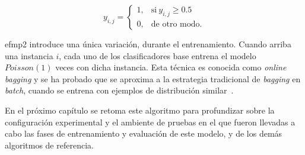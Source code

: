 \begin{equation}
	y_{i,j} =
	\begin{cases}
		1, & \text{si}\ y_{i,j} \geq 0.5 \\
		0, & \text{de otro modo.}
	\end{cases}
\end{equation}

\acrshort{efmp2} introduce una única variación, durante el entrenamiento. Cuando
arriba una instancia $i$, cada uno de los clasificadores base entrena el modelo
$Poisson(1)$ veces con dicha instancia. Esta técnica es conocida como
\textit{online bagging} y se ha probado que se aproxima a la estrategia
tradicional de \textit{bagging} en \textit{batch}, cuando se entrena con
ejemplos de distribución similar~\cite{oza_online_2005}.

En el próximo capítulo se retoma este algoritmo para profundizar sobre la
configuración experimental y el ambiente de pruebas en el que fueron llevadas a
cabo las fases de entrenamiento y evaluación de este modelo, y de los demás
algoritmos de referencia.
